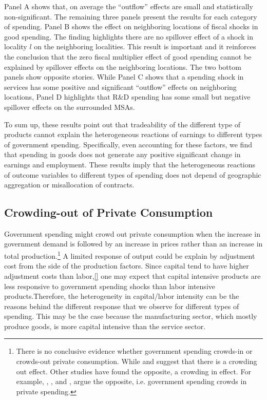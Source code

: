 \documentclass[dv_diss_main.tex]{subfiles}
\begin{document}
Panel A shows that, on average the ``outflow'' effects are small and statistically non-significant. The remaining three panels present the results for each category of spending. Panel B shows the effect on neighboring locations of fiscal shocks in good spending. The finding highlights there are no spillover effect of a shock in locality $l$ on the neighboring localities. This result is important and it reinforces the conclusion that the zero fiscal multiplier effect of good spending cannot be explained by spillover effects on the neighboring locations. The two bottom panels show opposite stories. While Panel C shows that a spending shock in services has some positive and significant ``outflow'' effects on neighboring locations, Panel D highlights that R\&D spending has some small but negative spillover effects on the surrounded MSAs.
 
To sum up, these results point out that tradeability of the different type of products cannot explain the heterogeneous reactions of earnings to different types of government spending. Specifically, even accounting for these factors, we find that spending in goods does not generate any positive significant change in earnings and employment. These results imply that the heterogeneous reactions of outcome variables to different types of spending does not depend of geographic aggregation or misallocation of contracts.


\subsection{Crowding-out of Private Consumption}
\label{subsec:crowd}

Government spending might crowd out private consumption when the increase in government demand is followed by an increase in prices rather than an increase in total production.\footnote{There is no conclusive evidence whether government spending crowds-in or crowds-out private consumption. While \cite{Bailey1971} and \cite{Barro1981} suggest that there is a crowding out effect. Other studies have found the opposite, a crowding in effect. For example, \cite{Perotti2005}, \cite{Canzoneri2002}, and \cite{Mountford2009}, argue the opposite, i.e. government spending crowds in private spending.} A limited response of output could be explain by adjustment cost from the side of the production factors. Since capital tend to have higher adjustment costs than labor,\ref{} one may expect that capital intensive products are less responsive to government spending shocks than labor intensive products.Therefore, the heterogeneity in capital/labor intensity can be the reasons behind the different response that we observe for different types of spending. This may be the case because the manufacturing sector, which mostly produce goods, is more capital intensive than the service sector.  
\end{document}
